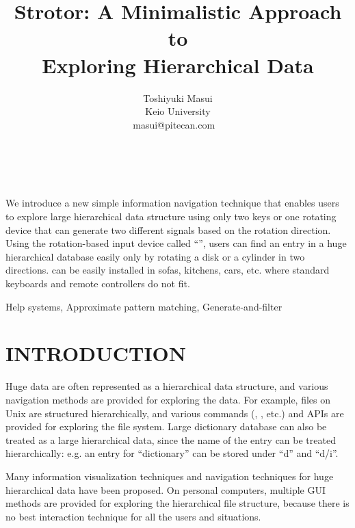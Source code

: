 \documentclass{article}
\begin{document}
\title{Strotor: A Minimalistic Approach to \\
Exploring Hierarchical Data}
\author{
\begin{tabular}{l}
\parbox{5.5cm}{
\begin{center}
Toshiyuki Masui\\
Keio University\\
masui@pitecan.com
~ \\
~ \\
~
\end{center}
}
\end{tabular}
}
\maketitle
\abstract
We introduce a new simple information navigation technique
that enables users to explore large hierarchical data structure
using only two keys or one rotating device that can generate
two different signals based on the rotation direction.
%
Using the rotation-based input device called ``\ST'',
users can find an entry in a huge hierarchical database easily
only by rotating a disk or a cylinder in two directions.
%
{\ST} can be easily installed in sofas, kitchens, cars, etc.
where standard keyboards and remote controllers do not fit.

\keywords Help systems, Approximate pattern matching, Generate-and-filter


\section*{INTRODUCTION}

Huge data are often represented as a hierarchical data structure, and
various navigation methods are provided for exploring the data.
For example, files on Unix are structured hierarchically, and
various commands (, , etc.) and APIs are provided for exploring the file system.
Large dictionary database can also be treated as a large
hierarchical data, since the name of the entry can be treated hierarchically:
e.g. an entry for ``dictionary'' can be stored under ``d'' and ``d/i''.

Many information visualization techniques and navigation techniques for huge hierarchical data
have been proposed.
On personal computers,
multiple GUI methods are provided for
exploring the hierarchical file structure, because
there is no best interaction technique for all the users and situations.
\end{document}
